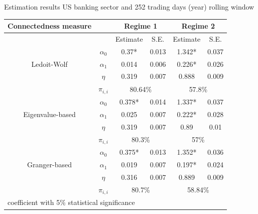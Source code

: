 \documentclass{beamer}
\begin{document}
\begin{frame}{Estimation results}
    US banking sector and 252 trading days (year) rolling window 
    \begin{table}\small
        \begin{tabular}{cccccc}
          \toprule
           Connectedness measure &  & \multicolumn{2}{c}{\bfseries Regime 1} & \multicolumn{2}{c}{\bfseries Regime 2}  \\
           \hline
           & & Estimate & S.E. & Estimate & S.E. \\
           \hline
           \multirow{3}{*}[\normalbaselineskip]{Ledoit-Wolf} & $\alpha_0$ & 0.37* & 0.013 & 1.342*  & 0.037 \\
            & $\alpha_1$ & 0.014 & 0.006 & 0.226* & 0.026 \\
            & $\eta$ & 0.319 & 0.007 & 0.888 & 0.009 \\
            & $\pi_{i,i}$ &  \multicolumn{2}{c}{80.64\%} & \multicolumn{2}{c}{57.8\%}\\
            \hline
            \multirow{3}{*}[\normalbaselineskip]{Eigenvalue-based} & $\alpha_0$ & 0.378* & 0.014 & 1.337*  & 0.037 \\
            & $\alpha_1$ & 0.025 & 0.007 & 0.222* & 0.028 \\
            & $\eta$ & 0.319 & 0.007 & 0.89 & 0.01 \\
            & $\pi_{i,i}$ &  \multicolumn{2}{c}{80.3\%} & \multicolumn{2}{c}{57\%}\\
            \hline
            \multirow{3}{*}[\normalbaselineskip]{Granger-based} & $\alpha_0$ & 0.375* & 0.013 & 1.352*  & 0.036 \\
            & $\alpha_1$ & 0.019 & 0.007 & 0.197* & 0.024 \\
            & $\eta$ & 0.316 & 0.007 & 0.889 & 0.009 \\
            & $\pi_{i,i}$ &  \multicolumn{2}{c}{80.7\%} & \multicolumn{2}{c}{58.84\%}\\
            \hline
          \multicolumn{6}{l}{\footnotesize * coefficient with 5\% statistical significance} \\
          \hline
        \end{tabular}
      \end{table}

\end{frame}    
\end{document}
